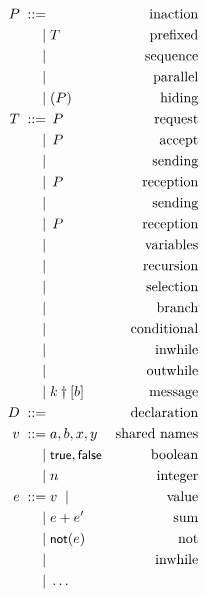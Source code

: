 \documentclass{article}
\begin{document}
\begin{align*}
  P \grmeq & \inact                       & \text{inaction}\\
    \grmor & T                            & \text{prefixed}\\
    \grmor & \seqcomp PQ                  & \text{sequence}\\
    \grmor & \parcomp PQ                  & \text{parallel}\\
    \grmor & \restrict uP                 & \text{hiding}\\
  T \grmeq & \request akP                 & \text{request}\\
    \grmor & \accept akP                  & \text{accept}\\
    \grmor & \send{k}{e}{}                & \text{sending}\\
    \grmor & \recv kxP                    & \text{reception}\\
    \grmor & \hosend k{k'}{}              & \text{sending}\\
    \grmor & \horecv k{k'}P               & \text{reception}\\
    \grmor & \vars Xek                    & \text{variables}\\
    \grmor & \recur DP                    & \text{recursion}\\
    \grmor & \select kl                   & \text{selection}\\
    \grmor & \branch klP                  & \text{branch}\\
    \grmor & \cond ePQ                    & \text{conditional}\\
    \grmor & \inwhile kQ                  & \text{inwhile}\\
    \grmor & \outwhile keP                & \text{outwhile}\\
    \grmor & k\dagger[b]                  & \text{message}\\
  D \grmeq & \declare XxkP                & \text{declaration}\\
  v \grmeq & a, b, x, y                   & \text{shared names}\\
    \grmor & \truek, \falsek              & \text{boolean}\\
    \grmor & n                            & \text{integer}\\
  e \grmeq & v \grmor                     & \text{value}\\
    \grmor & e + e'                       & \text{sum}\\
    \grmor & \notk(e)                     & \text{not}\\
    \grmor & \inwhilee k                  & \text{inwhile}\\
    \grmor & \dots                                        \\
\end{align*}
\end{document}
